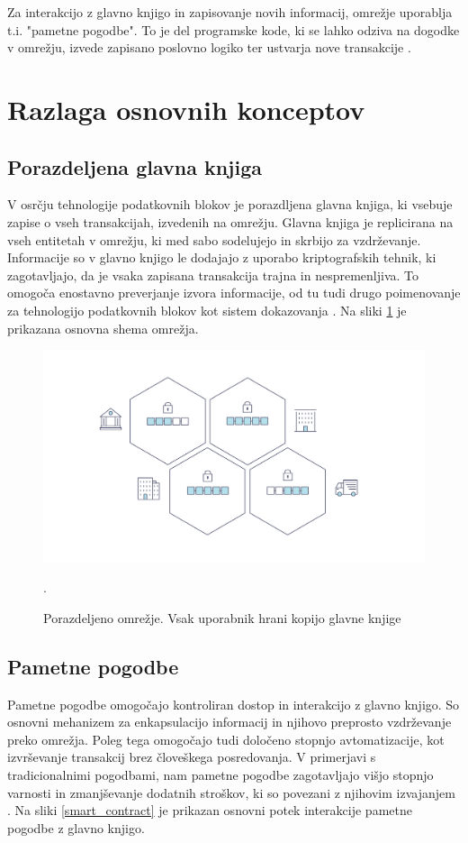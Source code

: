 \documentclass[a4paper, 12pt]{book}
\begin{document}
Za interakcijo z glavno knjigo in zapisovanje novih informacij, omrežje uporablja t.i. "pametne pogodbe".
To je del programske kode, ki se lahko odziva na dogodke v omrežju, izvede zapisano poslovno logiko ter ustvarja nove transakcije \cite{hyperledgerDocs}.

\section{Razlaga osnovnih konceptov}

\subsection{Porazdeljena glavna knjiga}
V osrčju tehnologije podatkovnih blokov je porazdljena glavna knjiga, ki vsebuje zapise o vseh transakcijah, izvedenih na omrežju.
Glavna knjiga je replicirana na vseh entitetah v omrežju, ki med sabo sodelujejo in skrbijo za vzdrževanje.
Informacije so v glavno knjigo le dodajajo z uporabo kriptografskih tehnik, ki zagotavljajo, da je vsaka zapisana transakcija trajna in nespremenljiva.
To omogoča enostavno preverjanje izvora informacije, od tu tudi drugo poimenovanje za tehnologijo podatkovnih blokov kot sistem dokazovanja \cite{hyperledgerDocs}.
Na sliki \ref{hyperledger_basic_network} je prikazana osnovna shema omrežja.

\begin{figure}[h]
	\includegraphics[width=1.0\textwidth]{slike/basic_network.png}
	\label{hyperledger_basic_network}
	\caption{Porazdeljeno omrežje. Vsak uporabnik hrani kopijo glavne knjige \cite{hyperledgerDocs}}.
\end{figure}

\subsection{Pametne pogodbe}
Pametne pogodbe omogočajo kontroliran dostop in interakcijo z glavno knjigo.
So osnovni mehanizem za enkapsulacijo informacij in njihovo preprosto vzdrževanje preko omrežja.
Poleg tega omogočajo tudi določeno stopnjo avtomatizacije, kot izvrševanje transakcij brez človeškega posredovanja.
V primerjavi s tradicionalnimi pogodbami, nam pametne pogodbe zagotavljajo višjo stopnjo varnosti in zmanjševanje dodatnih stroškov, ki so povezani z njihovim izvajanjem \cite{atzei2017survey}.
Na sliki \ref{smart_contract} je prikazan osnovni potek interakcije pametne pogodbe z glavno knjigo.
\end{document}
